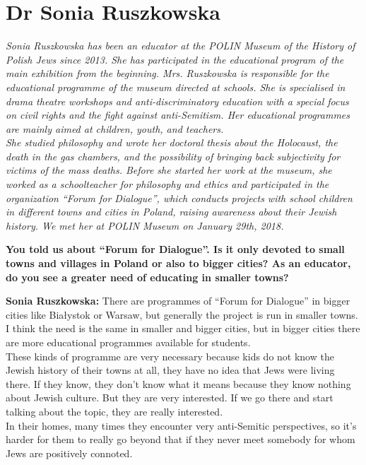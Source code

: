 \section{Dr Sonia Ruszkowska}

\textit{Sonia Ruszkowska has been an educator at the POLIN Museum of the History of Polish Jews since 2013. She has participated in the educational program of the main exhibition from the beginning. Mrs. Ruszkowska is responsible for the educational programme of the museum directed at schools. She is specialised in drama theatre workshops and anti-discriminatory education with a special focus on civil rights and the fight against anti-Semitism. Her educational programmes are mainly aimed at children, youth, and teachers.\\
She studied philosophy and wrote her doctoral thesis about the Holocaust, the death in the gas chambers, and the possibility of bringing back subjectivity for victims of the mass deaths. Before she started her work at the museum, she worked as a schoolteacher for philosophy and ethics and participated in the organization ``Forum for Dialogue'', which conducts projects with school children in different towns and cities in Poland, raising awareness about their Jewish history. We met her at POLIN Museum on January 29th, 2018.}\par  
\vspace*{2em}
\textbf{You told us about ``Forum for Dialogue''. Is it only devoted to small towns and villages in Poland or also to bigger cities? As an educator, do you see a greater need of educating in smaller towns?} 

\textbf{Sonia Ruszkowska:} There are programmes of ``Forum for Dialogue'' in bigger cities like Białystok or Warsaw, but generally the project is run in smaller towns. I think the need is the same in smaller and bigger cities, but in bigger cities there are more educational programmes available for students.\\
These kinds of programme are very necessary because kids do not know the Jewish history of their towns at all, they have no idea that Jews were living there. If they know, they don't know what it means because they know nothing about Jewish culture. But they are very interested. If we go there and start talking about the topic, they are really interested.\\
In their homes, many times they encounter very anti-Semitic perspectives, so it’s harder for them to really go beyond that if they never meet somebody for whom Jews are positively connoted. 

